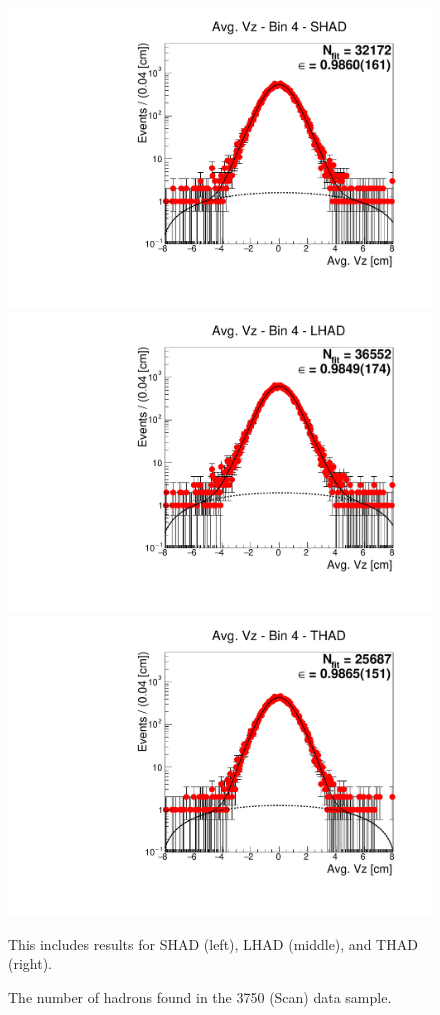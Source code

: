 \begin{figure}[H]
\centering
\includegraphics[scale=0.25]{figures/plots/nonDDbar_fit_results/scan/fit_scan_04_data_SHAD.pdf}
\hspace{-0.5cm}
\includegraphics[scale=0.25]{figures/plots/nonDDbar_fit_results/scan/fit_scan_04_data_LHAD.pdf}
\hspace{-0.5cm}
\includegraphics[scale=0.25]{figures/plots/nonDDbar_fit_results/scan/fit_scan_04_data_THAD.pdf}
\caption{The number of hadrons found in the 3750 (Scan) data sample.}
{This includes results for SHAD (left), LHAD (middle), and THAD (right).}
\label{fig:hadron_fits_scan_04}
\end{figure}


